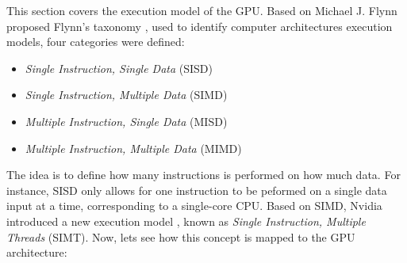 
This section covers the execution model of the GPU.
Based on Michael J. Flynn proposed Flynn's taxonomy \cite{Flynn1972}, used to identify computer architectures execution models, four categories were defined:

\begin{itemize}
	\item \textit{Single Instruction, Single Data} (SISD)
	\item \textit{Single Instruction, Multiple Data} (SIMD)
	\item \textit{Multiple Instruction, Single Data} (MISD)
	\item \textit{Multiple Instruction, Multiple Data} (MIMD)
\end{itemize}

The idea is to define how many instructions is performed on how much data.
For instance, SISD only allows for one instruction to be peformed on a single data input at a time, corresponding to a single-core CPU.
Based on SIMD, Nvidia introduced a new execution model \cite{Nvidia2009}, known as \textit{Single Instruction, Multiple Threads} (SIMT).
Now, lets see how this concept is mapped to the GPU architecture:


